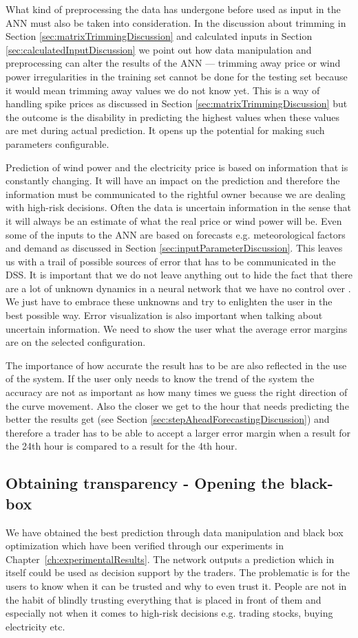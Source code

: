 What kind of preprocessing the data has undergone before used as input in the ANN must also be taken into consideration. In the discussion about trimming in Section \ref{sec:matrixTrimmingDiscussion} and calculated inputs in Section \ref{sec:calculatedInputDiscussion} we point out how data manipulation and preprocessing can alter the results of the ANN --- trimming away price or wind power irregularities in the training set cannot be done for the testing set because it would mean trimming away values we do not know yet.  This is a way of handling spike prices as discussed in Section \ref{sec:matrixTrimmingDiscussion} but the outcome is the disability in predicting the highest values when these values are met during actual prediction. It opens up the potential for making such parameters configurable.

Prediction of wind power and the electricity price is based on information that is constantly changing. It will have an impact on the prediction and therefore the information must be communicated to the rightful owner because we are dealing with high-risk decisions. Often the data is uncertain information in the sense that it will always be an estimate of what the real price or wind power will be. Even some of the inputs to the ANN are based on forecasts e.g. meteorological factors and demand as discussed in Section \ref{sec:inputParameterDiscussion}. This leaves us with a trail of possible sources of error that has to be communicated in the DSS. It is important that we do not leave anything out to hide the fact that there are a lot of unknown dynamics in a neural network that we have no control over \cite{young2010using}. We just have to embrace these unknowns and try to enlighten the user in the best possible way. Error visualization is also important when talking about uncertain information. We need to show the user what the average error margins are on the selected configuration.

The importance of how accurate the result has to be are also reflected in the use of the system. If the user only needs to know the trend of the system the accuracy are not as important as how many times we guess the right direction of the curve movement. Also the closer we get to the hour that needs predicting the better the results get (see Section \ref{sec:stepAheadForecastingDiscussion}) and therefore a trader has to be able to accept a larger error margin when a result for the 24th hour is compared to a result for the 4th hour.

\subsection{Obtaining transparency - Opening the black-box}
We have obtained the best prediction through data manipulation and black box optimization which have been verified through our experiments in Chapter~\ref{ch:experimentalResults}. The network outputs a prediction which in itself could be used as decision support by the traders. The problematic is for the users to know when it can be trusted and why to even trust it. People are not in the habit of blindly trusting everything that is placed in front of them and especially not when it comes to high-risk decisions e.g. trading stocks, buying electricity etc.

